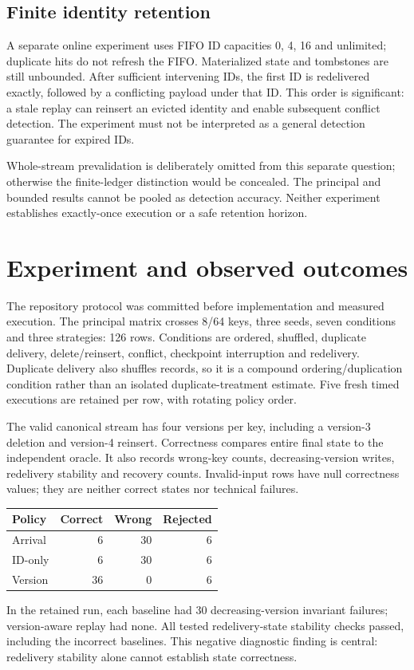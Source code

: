 \documentclass[10pt,twocolumn]{article}
\begin{document}
\subsection{Finite identity retention}
A separate online experiment uses FIFO ID capacities 0, 4, 16 and unlimited; duplicate
hits do not refresh the FIFO. Materialized state and tombstones are still unbounded.
After sufficient intervening IDs, the first ID is redelivered exactly, followed by
a conflicting payload under that ID. This order is significant: a stale replay can
reinsert an evicted identity and enable subsequent conflict detection. The experiment
must not be interpreted as a general detection guarantee for expired IDs.

Whole-stream prevalidation is deliberately omitted from this separate question;
otherwise the finite-ledger distinction would be concealed. The principal and bounded
results cannot be pooled as detection accuracy. Neither experiment establishes
exactly-once execution or a safe retention horizon.
\clearpage
\section{Experiment and observed outcomes}
The repository protocol was committed before implementation and measured execution.
The principal matrix crosses 8/64 keys, three seeds, seven conditions and three
strategies: 126 rows. Conditions are ordered, shuffled, duplicate delivery,
delete/reinsert, conflict, checkpoint interruption and redelivery. Duplicate delivery
also shuffles records, so it is a compound ordering/duplication condition rather
than an isolated duplicate-treatment estimate. Five fresh timed executions are
retained per row, with rotating policy order.

The valid canonical stream has four versions per key, including a version-3 deletion
and version-4 reinsert. Correctness compares entire final state to the independent
oracle. It also records wrong-key counts, decreasing-version writes, redelivery
stability and recovery counts. Invalid-input rows have null correctness values;
they are neither correct states nor technical failures.

\begin{center}
\begin{tabular}{lrrr}\toprule
Policy & Correct & Wrong & Rejected\\\midrule
Arrival & 6 & 30 & 6\\
ID-only & 6 & 30 & 6\\
Version & 36 & 0 & 6\\\bottomrule
\end{tabular}
\end{center}
In the retained run, each baseline had 30 decreasing-version invariant failures;
version-aware replay had none. All tested redelivery-state stability checks passed,
including the incorrect baselines. This negative diagnostic finding is central:
redelivery stability alone cannot establish state correctness.
\end{document}
